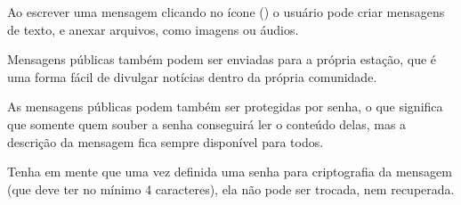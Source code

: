 \documentclass[11pt,a4paper]{article}
\begin{document}


Ao escrever uma mensagem clicando no ícone () o usuário pode criar mensagens de texto, e anexar arquivos, como imagens ou áudios. 



Mensagens públicas também podem ser enviadas para a própria estação,  que é uma forma fácil de divulgar notícias dentro da própria comunidade.



As mensagens públicas podem também ser protegidas por senha, o que significa que somente quem souber a senha conseguirá ler o conteúdo delas, mas a descrição da mensagem fica sempre disponível para todos.



Tenha em mente que uma vez definida uma senha para criptografia da mensagem (que deve ter no mínimo 4 caracteres), ela não pode ser trocada, nem recuperada.


\end{document}
